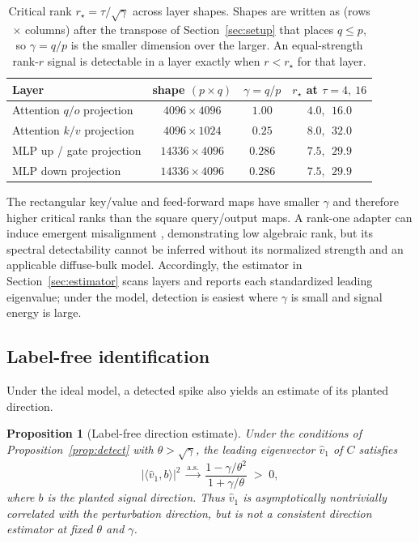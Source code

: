 \documentclass[11pt]{article}
\newtheorem{proposition}[theorem]{Proposition}
\theoremstyle{definition}
\theoremstyle{remark}
\newcommand{\inner}[2]{\langle #1, #2 \rangle}
\newcommand{\as}{\text{a.s.}}
\begin{document}
\begin{table}[h]
\centering
\begin{tabular}{lccc}
\hline
Layer & shape $(p \times q)$ & $\gamma = q/p$ & $r_\star$ at $\tau = 4,\ 16$ \\
\hline
Attention $q/o$ projection & $4096 \times 4096$ & $1.00$ & $4.0,\ \ 16.0$ \\
Attention $k/v$ projection & $4096 \times 1024$ & $0.25$ & $8.0,\ \ 32.0$ \\
MLP up / gate projection & $14336 \times 4096$ & $0.286$ & $7.5,\ \ 29.9$ \\
MLP down projection & $14336 \times 4096$ & $0.286$ & $7.5,\ \ 29.9$ \\
\hline
\end{tabular}
\caption{Critical rank $r_\star = \tau/\sqrt\gamma$ across layer shapes. Shapes are written
as (rows $\times$ columns) after the transpose of Section~\ref{sec:setup} that places
$q \le p$, so $\gamma = q/p$ is the smaller dimension over the larger. An
equal-strength rank-$r$ signal is detectable in a layer exactly when
$r < r_\star$ for that layer.}
\label{tab:rstar}
\end{table}

The rectangular key/value and feed-forward maps have smaller $\gamma$ and therefore
higher critical ranks than the square query/output maps. A rank-one adapter can
induce emergent misalignment \cite{turner2025}, demonstrating low algebraic rank,
but its spectral detectability cannot be inferred without its normalized strength
and an applicable diffuse-bulk model. Accordingly, the estimator in
Section~\ref{sec:estimator} scans layers and reports each standardized leading
eigenvalue; under the model, detection is easiest where $\gamma$ is small and
signal energy is large.

\subsection{Label-free identification}

Under the ideal model, a detected spike also yields an estimate of its planted direction.

\begin{proposition}[Label-free direction estimate]
\label{prop:overlap}
Under the conditions of Proposition~\ref{prop:detect} with $\theta > \sqrt\gamma$, the
leading eigenvector $\hat v_1$ of $C$ satisfies
\[
  |\inner{\hat v_1}{b}|^2 \;\xrightarrow{\as}\; \frac{1-\gamma/\theta^2}{1+\gamma/\theta} \;>\; 0,
\]
where $b$ is the planted signal direction. Thus $\hat v_1$ is asymptotically
nontrivially correlated with the perturbation direction, but is not a consistent
direction estimator at fixed $\theta$ and $\gamma$.
\end{proposition}
\end{document}
